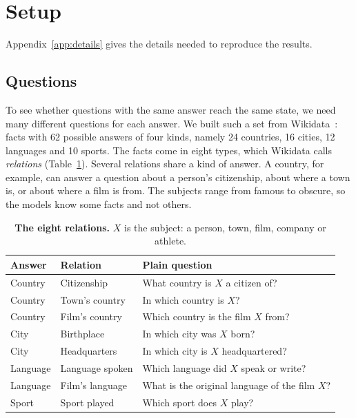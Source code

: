 \section{Setup}
\label{sec:setup}

Appendix~\ref{app:details} gives the details needed to reproduce the results.

\subsection{Questions}
\label{sec:questions}
To see whether questions with the same answer reach the same state, we need many different questions for each answer. We built such a set from Wikidata~\citep{vrandecic2014wikidata}: \NFacts{} facts with 62 possible answers of four kinds, namely 24 countries, 16 cities, 12 languages and 10 sports. The facts come in eight types, which Wikidata calls \emph{relations} (Table~\ref{tab:relations}). Several relations share a kind of answer. A country, for example, can answer a question about a person's citizenship, about where a town is, or about where a film is from. The subjects range from famous to obscure, so the models know some facts and not others.

\begin{table}[t]
\centering
\footnotesize
\setlength{\tabcolsep}{3pt}
\begin{tabular}{@{}lll@{}}
\toprule
Answer & Relation & Plain question \\
\midrule
Country & Citizenship & What country is $X$ a citizen of? \\
Country & Town's country & In which country is $X$? \\
Country & Film's country & Which country is the film $X$ from? \\
City & Birthplace & In which city was $X$ born? \\
City & Headquarters & In which city is $X$ headquartered? \\
Language & Language spoken & Which language did $X$ speak or write? \\
Language & Film's language & What is the original language of the film $X$? \\
Sport & Sport played & Which sport does $X$ play? \\
\bottomrule
\end{tabular}
\caption{\textbf{The eight relations.} $X$ is the subject: a person, town, film, company or athlete.}
\label{tab:relations}
\end{table}

